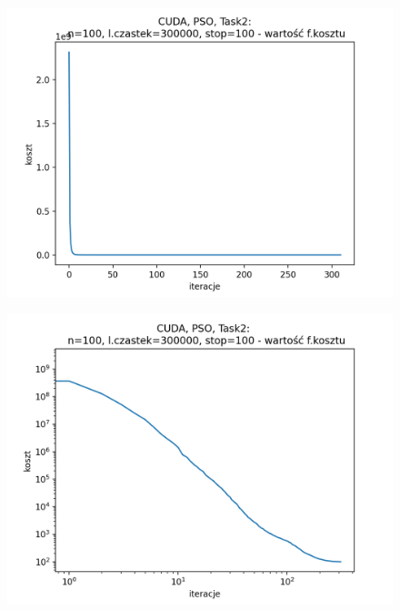 \documentclass[11pt, a4paper, oneside]{article}
\begin{document}
\begin{figure}[H]
\centering
\begin{minipage}[b]{\dimexpr.5\textwidth-1em}
  \centering
  \includegraphics[width=1\linewidth]{grafiki2/CUDA/CUDA_PSO_Task2_koszt_linear.png}
  \label{fig:koszt:PSO2CUDA}
\end{minipage} \hfill
\begin{minipage}[b]{\dimexpr.5\textwidth-1em}
  \centering
  \includegraphics[width=1\linewidth]{grafiki2/CUDA/CUDA_PSO_Task2_koszt_log.png}
  \label{fig:koszt:PSO2CUDAlog}
\end{minipage}
\end{figure}
\end{document}
